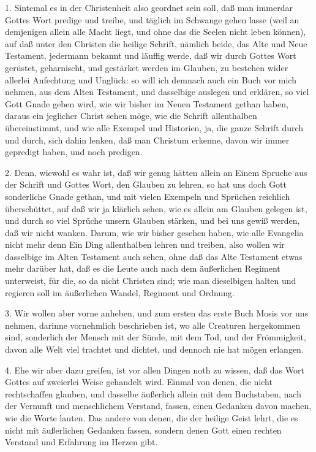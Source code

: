 1. Sintemal es in der Christenheit also geordnet sein soll, daß man immerdar Gottes Wort predige und treibe, und täglich im Schwange gehen lasse (weil an demjenigen allein alle Macht liegt, und ohne das die Seelen nicht leben können), auf daß unter den Christen die heilige Schrift, nämlich beide, das Alte und Neue Testament, jedermann bekannt und läuffig werde, daß wir durch Gottes Wort gerüstet, geharnischt, und gestärket werden im Glauben, zu bestehen wider allerlei Anfechtung und Unglück: so will ich demnach auch ein Buch vor mich nehmen, aus dem Alten Testament, und dasselbige auslegen und erklären, so viel Gott Gnade geben wird, wie wir bisher im Neuen Testament gethan haben, daraus ein jeglicher Christ sehen möge, wie die Schrift allenthalben übereinstimmt, und wie alle Exempel und Historien, ja, die ganze Schrift durch und durch, sich dahin lenken, daß man Christum erkenne, davon wir immer gepredigt haben, und noch predigen.

2. Denn, wiewohl es wahr ist, daß wir genug hätten allein an Einem Spruche aus der Schrift und Gottes Wort, den Glauben zu lehren, so hat uns doch Gott sonderliche Gnade gethan, und mit vielen Exempeln und Sprüchen reichlich überschüttet, auf daß wir ja klärlich sehen, wie es allein am Glauben gelegen ist, und durch so viel Sprüche unsern Glauben stärken, und bei uns gewiß werden, daß wir nicht wanken. Darum, wie wir bisher gesehen haben, wie alle Evangelia nicht mehr denn Ein Ding allenthalben lehren und treiben, also wollen wir dasselbige im Alten Testament auch sehen, ohne daß das Alte Testament etwas mehr darüber hat, daß es die Leute auch nach dem äußerlichen Regiment unterweist, für die, so da nicht Christen sind; wie man dieselbigen halten und regieren soll im äußerlichen Wandel, Regiment und Ordnung.

3. Wir wollen aber vorne anheben, und zum ersten das erste Buch Mosis vor uns nehmen, darinne vornehmlich beschrieben ist, wo alle Creaturen hergekommen sind, sonderlich der Mensch mit der Sünde, mit dem Tod, und der Frömmigkeit, davon alle Welt viel trachtet und dichtet, und dennoch nie hat mögen erlangen.

4. Ehe wir aber dazu greifen, ist vor allen Dingen noth zu wissen, daß das Wort Gottes auf zweierlei Weise gehandelt wird. Einmal von denen, die nicht rechtschaffen glauben, und dasselbe äußerlich allein mit dem Buchstaben, nach der Vernunft und menschlichem Verstand, fassen, einen Gedanken davon machen, wie die Worte lauten. Das andere von denen, die der heilige Geist lehrt, die es nicht mit äußerlichen Gedanken fassen, sondern denen Gott einen rechten Verstand und Erfahrung im Herzen gibt.

